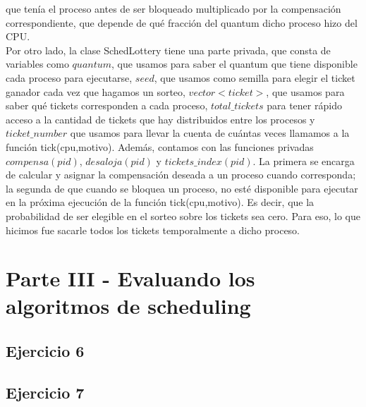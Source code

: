 \documentclass[a4paper]{article}
\begin{document}
que ten\'ia el proceso antes de ser bloqueado multiplicado por la compensaci\'on correspondiente, que 
depende de qu\'e fracci\'on del quantum dicho proceso hizo del CPU. \\
Por otro lado, la clase SchedLottery tiene una parte privada, que consta de variables como $quantum$, 
que usamos para saber el quantum que tiene disponible cada proceso para ejecutarse, $seed$, que
usamos como semilla para elegir el ticket ganador cada vez que hagamos un sorteo, $vector<ticket>$, que
usamos para saber qu\'e tickets corresponden a cada proceso, $total\_tickets$ para tener r\'apido acceso
a la cantidad de tickets que hay distribuidos entre los procesos y $ticket\_number$ que usamos para 
llevar la cuenta de cu\'antas veces llamamos a la funci\'on tick(cpu,motivo). Adem\'as, contamos con 
las funciones privadas $compensa(pid)$, $desaloja(pid)$ y $tickets\_index(pid)$. La primera se encarga de
calcular y asignar la compensaci\'on deseada a un proceso cuando corresponda; la segunda de que cuando
se bloquea un proceso, no est\'e disponible para ejecutar en la pr\'oxima ejecuci\'on de la funci\'on
tick(cpu,motivo). Es decir, que la probabilidad de ser elegible en el sorteo sobre los tickets sea cero.
Para eso, lo que hicimos fue sacarle todos los tickets temporalmente a dicho proceso. \\ 




\newpage
{}
\section{Parte III - Evaluando los algoritmos de scheduling}

\subsection{Ejercicio 6}
\subsection{Ejercicio 7}
\newpage
\end{document}
